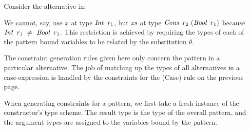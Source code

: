 
Consider the alternative in:


We cannot, say, use $x$ at type $\operatorname{\mathit{Int}} \ r_1$, but $\operatorname{\mathit{xs}}$ at type $\operatorname{\mathit{Cons}} \ r_2 \ (\operatorname{\mathit{Bool}} \ r_1)$ because $\operatorname{\mathit{Int}} \ r_1 \ \neq \ \operatorname{\mathit{Bool}} \ r_1$. This restriction is achieved by requiring the types of each of the pattern bound variables to be related by the substitution $\theta$.

The constraint generation rules given here only concern the pattern in a particular alternative. The job of matching up the types of all alternatives in a case-expression is handled by the constraints for the (Case) rule on the previous page. 

When generating constraints for a pattern, we first take a fresh instance of the constructor's type scheme. The result type is the type of the overall pattern, and the argument types are assigned to the variables bound by the pattern.



